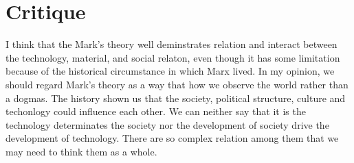 \documentclass[letterpaper,12pt]{article}
\begin{document}
\section{Critique}
I think that the Mark's theory well deminstrates relation and interact 
between the technology, material, and social relaton, even though it has some limitation 
because of the historical circumstance in which Marx lived.
In my opinion, we should regard Mark's theory as a way that how we observe the world 
rather than a dogmas. 
The history shown us that the society, political structure, culture and techonlogy 
could influence each other. We can neither say that it is the technology determinates the society 
nor the development of society drive the development of technology.
There are so complex relation among them that we may need to think them as a whole.



\end{document}
